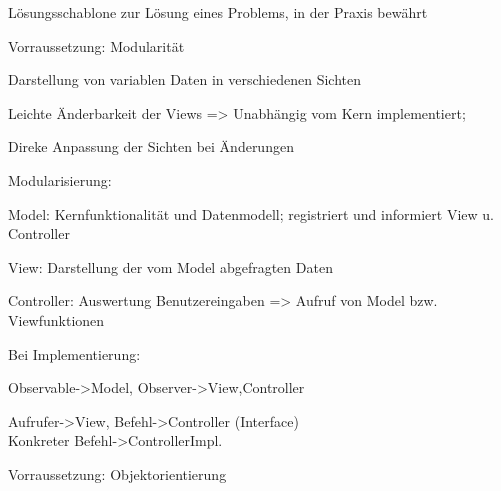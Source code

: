 Lösungsschablone zur Lösung eines Problems, in der Praxis bewährt

Vorraussetzung: Modularität

Darstellung von variablen Daten in verschiedenen Sichten

Leichte Änderbarkeit der Views => Unabhängig vom Kern implementiert;

Direke Anpassung der Sichten bei Änderungen

Modularisierung:

Model: Kernfunktionalität und Datenmodell; registriert und informiert View u. Controller

View: Darstellung der vom Model abgefragten Daten

Controller: Auswertung Benutzereingaben => Aufruf von Model bzw. Viewfunktionen

Bei Implementierung: 

 Observable->Model, Observer->View,Controller

 Aufrufer->View, Befehl->Controller (Interface) \\Konkreter Befehl->ControllerImpl.

Vorraussetzung: Objektorientierung


